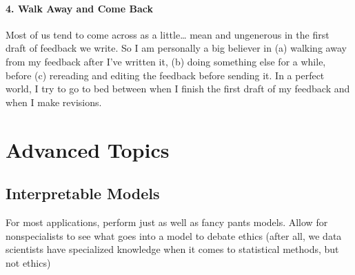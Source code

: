 \documentclass[letterpaper,10pt,english]{jupyterBook}
\begin{document}
\subsection{4. Walk Away and Come Back}
\label{\detokenize{40_in_practice/30_giving_feedback:walk-away-and-come-back}}
\sphinxAtStartPar
Most of us tend to come across as a little… mean and ungenerous in the first draft of feedback we write. So I am personally a big believer in (a) walking away from my feedback after I’ve written it, (b) doing something else for a while, before (c) re\sphinxhyphen{}reading and editing the feedback before sending it. In a perfect world, I try to go to bed between when I finish the first draft of my feedback and when I make revisions.

\sphinxstepscope


\part{Advanced Topics}

\sphinxstepscope


\chapter{Interpretable Models}
\label{\detokenize{40_advanced_topics/30_interpretability:interpretable-models}}\label{\detokenize{40_advanced_topics/30_interpretability::doc}}
\sphinxAtStartPar
For most applications, perform just as well as fancy pants models. 
Allow for non\sphinxhyphen{}specialists to see what goes into a model to debate ethics (after all, we data scientists have specialized knowledge when it comes to statistical methods, but not ethics)







\renewcommand{\indexname}{Index}
\printindex
\end{document}
